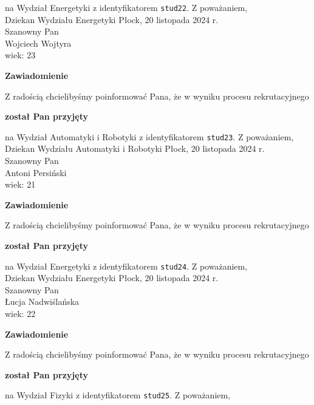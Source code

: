 \documentclass[12pt,a4paper]{article}
\begin{document}
na Wydział Energetyki z identyfikatorem \verb|stud22|. 
\vspace{2cm}
\noindent
Z poważaniem,\\
Dziekan
Wydziału Energetyki
\newpage
\hfill Płock, 20 listopada 2024 r.\\
\noindent 
Szanowny Pan \\
Wojciech Wojtyra \\
wiek: 23
\bigskip
\begin{center}
 	{\Large\textbf{Zawiadomienie}}
\end{center}
\bigskip
Z radością chcielibyśmy poinformować Pana, że w wyniku procesu rekrutacyjnego 
\begin{center}
\textsf{\textbf{został Pan przyjęty}} 
\end{center}
na Wydział Automatyki i Robotyki z identyfikatorem \verb|stud23|. 
\vspace{2cm}
\noindent
Z poważaniem,\\
Dziekan
Wydziału Automatyki i Robotyki
\newpage
\hfill Płock, 20 listopada 2024 r.\\
\noindent 
Szanowny Pan \\
Antoni Persiński \\
wiek: 21
\bigskip
\begin{center}
 	{\Large\textbf{Zawiadomienie}}
\end{center}
\bigskip
Z radością chcielibyśmy poinformować Pana, że w wyniku procesu rekrutacyjnego 
\begin{center}
\textsf{\textbf{został Pan przyjęty}} 
\end{center}
na Wydział Energetyki z identyfikatorem \verb|stud24|. 
\vspace{2cm}
\noindent
Z poważaniem,\\
Dziekan
Wydziału Energetyki
\newpage
\hfill Płock, 20 listopada 2024 r.\\
\noindent 
Szanowny Pan \\
Łucja Nadwiślańska \\
wiek: 22
\bigskip
\begin{center}
 	{\Large\textbf{Zawiadomienie}}
\end{center}
\bigskip
Z radością chcielibyśmy poinformować Pana, że w wyniku procesu rekrutacyjnego 
\begin{center}
\textsf{\textbf{został Pan przyjęty}} 
\end{center}
na Wydział Fizyki z identyfikatorem \verb|stud25|. 
\vspace{2cm}
\noindent
Z poważaniem,\\
\end{document}
